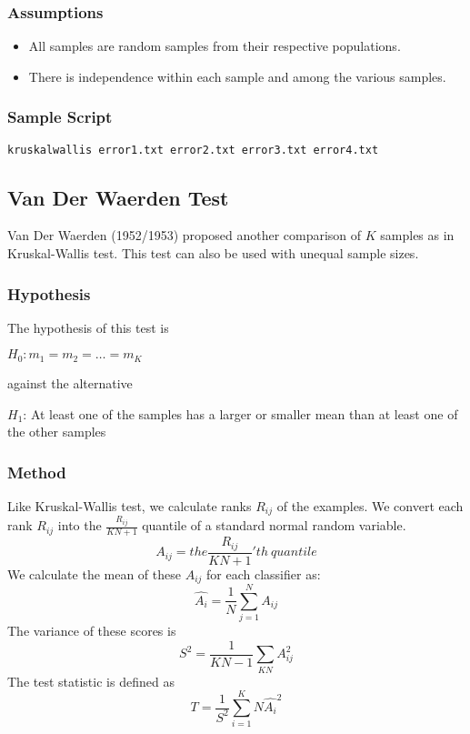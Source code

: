 \documentclass[a4paper,12pt]{book}
\begin{document}
\subsubsection{Assumptions}
\begin{itemize}
\item All samples are random samples from their respective populations.
\item There is independence within each sample and among the various samples.
\end{itemize}

\subsubsection{Sample Script}
\begin{verbatim}
kruskalwallis error1.txt error2.txt error3.txt error4.txt
\end{verbatim}

\subsection{Van Der Waerden Test}
Van Der Waerden (1952/1953) proposed another comparison of $K$ samples as in Kruskal-Wallis test.
This test can also be used with unequal sample sizes.

\subsubsection{Hypothesis}
The hypothesis of this test is  
\begin{center}
$H_0: m_1=m_2=\ldots=m_K$
\end{center}
against the alternative
\begin{center}
$H_1$: At least one of the samples has a larger or smaller mean than at least one of the other
samples
\end{center}

\subsubsection{Method}
Like Kruskal-Wallis test, we calculate ranks $R_{ij}$ of the examples. We convert each rank $R_{ij}$
into the $\frac{R_{ij}}{KN+1}$ quantile of a standard normal random variable.
\begin{equation}
A_{ij}=the \frac{R_{ij}}{KN+1}'th\ quantile
\end{equation}
We calculate the mean of these $A_{ij}$ for each classifier as:
\begin{equation}
\hat{A_i}=\frac{1}{N}\sum_{j=1}^NA_{ij}
\end{equation}
The variance of these scores is
\begin{equation}
S^2=\frac{1}{KN-1}\sum_{KN}A_{ij}^2
\end{equation}
The test statistic is defined as
\begin{equation}
T=\frac{1}{S^2}\sum_{i=1}^KN\hat{A_i}^2
\end{equation}
\end{document}
